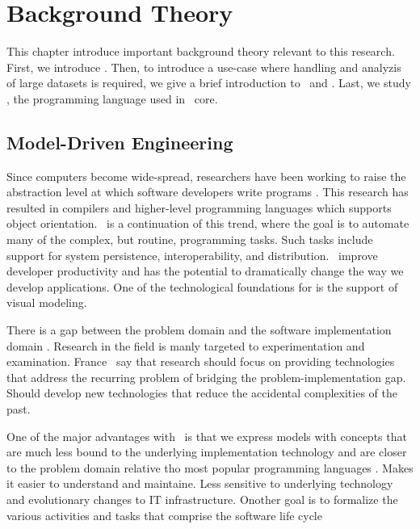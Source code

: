 \chapter{Background Theory}
\label{chap:background}
This chapter introduce important background theory relevant to this research. First, we introduce \mde. Then, to introduce a use-case where handling and analyzis of large datasets is required, we give a brief introduction to \bi~and \bd. Last, we study \delphi, the programming language used in \gap~core.

\clearpage


\section{Model-Driven Engineering}
\label{sec:Model-Driven Engineering}
Since computers become wide-spread, researchers have been working to raise the abstraction level at which software developers write programs \cite{Atkinson2003-wr}. This research has resulted in compilers and higher-level programming languages which supports object orientation. \mde~is a continuation of this trend, where the goal is to automate many of the complex, but routine, programming tasks. Such tasks include support for system persistence, interoperability, and distribution. \mde~improve developer productivity and has the potential to dramatically change the way we develop applications. One of the technological foundations for \mdd is the support of visual modeling. 

There is a gap between the problem domain and the software implementation domain \cite{France2007-ae}. Research in the field is manly targeted to experimentation and examination. France \ea~say that research should focus on providing technologies that address the recurring problem of bridging the problem-implementation gap. Should develop new technologies that reduce the accidental complexities of the past.

One of the major advantages with \mde~is that we express models with concepts that are much less bound to the underlying implementation technology and are closer to the problem domain relative tho most popular programming languages \cite{Selic2003-qa}. Makes it easier to understand and maintaine. Less sensitive to underlying technology and evolutionary changes to IT infrastructure.  Onother goal is to formalize the various activities and tasks that comprise the software life cycle \cite{Hailpern2006-vm}

